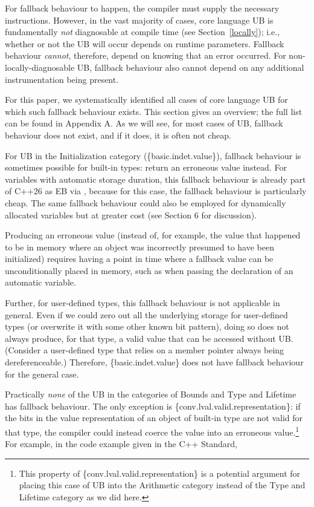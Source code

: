 For fallback behaviour to happen, the compiler must supply the necessary instructions. However, in the vast majority of cases, core language UB is fundamentally \emph{not} diagnosable at compile time (see Section~\ref{locally}); i.e., whether or not the UB will occur depends on runtime parameters. Fallback behaviour \emph{cannot}, therefore, depend on knowing that an error occurred. For non-locally-diagnosable UB, fallback behaviour also cannot depend on any additional instrumentation being present.

For this paper, we systematically identified all cases of core language UB for which such fallback behaviour exists. This section gives an overview; the full list can be found in Appendix A. As we will see, for most cases of UB, fallback behaviour does not exist, and if it does, it is often not cheap.

For UB in the Initialization category (\{basic.indet.value\}), fallback behaviour is sometimes possible for built-in types: return an erroneous value instead. For variables with automatic storage duration, this fallback behaviour is already part of C++26 as EB via \cite{P2795R5}, because for this case, the fallback behaviour is particularly cheap. The same fallback behaviour could also be employed for dynamically allocated variables but at greater cost (see \cite{P2723R1} Section 6 for discussion).

Producing an erroneous value (instead of, for example, the value that happened to be in memory where an object was incorrectly presumed to have been initialized) requires having a point in time where a fallback value can be unconditionally placed in memory, such as when passing the declaration of an automatic variable.

Further, for user-defined types, this fallback behaviour is not applicable in general. Even if we could zero out all the underlying storage for user-defined types (or overwrite it with some other known bit pattern), doing so does not always produce, for that type, a valid value that can be accessed without UB. (Consider a user-defined type that relies on a member pointer always being dereferenceable.) Therefore, \{basic.indet.value\} does not have fallback behaviour for the general case.

Practically \emph{none} of the UB in the categories of Bounds and Type and Lifetime has fallback behaviour. The only exception is \{conv.lval.valid.representation\}: if the bits in the value representation of an object of built-in type are not valid for that type, the compiler could instead coerce the value into an erroneous value.\footnote{This property of \{conv.lval.valid.representation\} is a potential argument for placing this case of UB into the Arithmetic category instead of the Type and Lifetime category as we did here.} For example, in the code example given in the C++ Standard,


